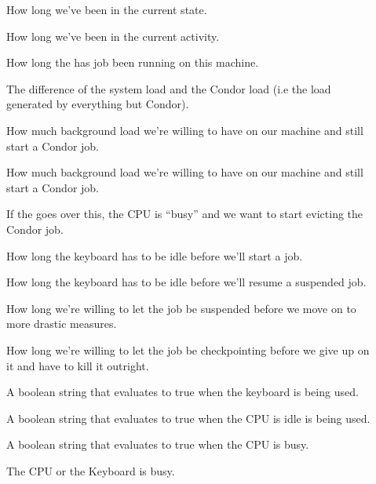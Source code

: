 \begin{description}
  
\item[] How long we've been in the current state.

\item[] How long we've been in the current
  activity. 

\item[] How long the has job been running on
  this machine.

\item[] The difference of the system load and
  the Condor load (i.e the load generated by everything but Condor).

\item[] How much background load we're willing
  to have on our machine and still start a Condor job.

\item[] How much background load we're willing
  to have on our machine and still start a Condor job.

\item[] If the  goes over
  this, the CPU is ``busy'' and we want to start evicting the Condor
  job. 

\item[] How long the keyboard has to be idle
  before we'll start a job.

\item[] How long the keyboard has to be idle
  before we'll resume a suspended job.

\item[] How long we're willing to let the job be
  suspended before we move on to more drastic measures.

\item[] How long we're willing to let the job be
  checkpointing before we give up on it and have to kill it outright.

\item[] A boolean string that evaluates to true
    when the keyboard is being used. 

\item[] A boolean string that evaluates to true
    when the CPU is idle is being used.

\item[] A boolean string that evaluates to true
    when the CPU is busy.

\item[] The CPU or the Keyboard is busy.

\end{description}

